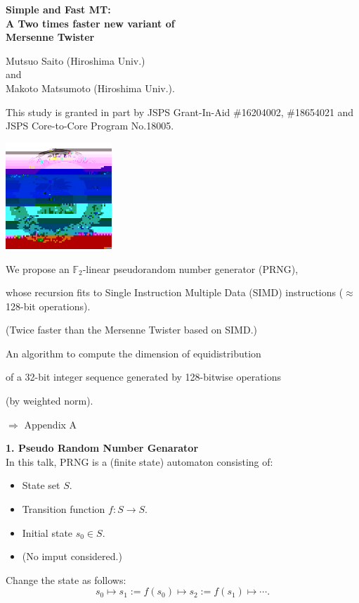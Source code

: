 \documentclass[a4j,12pt,landscape]{jarticle}
\title{}
\author{}
\date{\today}
\def\F2{{\mathbb F}_2}
\begin{document}
\Huge

\begin{center}
{\bf Simple and Fast MT:\\
  A Two times faster new variant of \\
  Mersenne Twister}
\vspace{1cm}

Mutsuo Saito (Hiroshima Univ.) \\
and \\
Makoto Matsumoto (Hiroshima Univ.).
\end{center}
\vspace{\fill}
\parbox{19cm}{\Large
This study is granted in part by
JSPS Grant-In-Aid \#16204002, \#18654021
and JSPS Core-to-Core Program No.18005.
}
\parbox{2cm}{\vskip 1cm \includegraphics*[width=4cm,height=4cm]{logo.jpg}}

\newpage
We propose
an $\F2$-linear pseudorandom number generator (PRNG),

whose recursion fits to Single Instruction Multiple Data (SIMD)
instructions ($\approx$ 128-bit operations).

(Twice faster than the Mersenne Twister
 based on SIMD.)

\vskip 5mm
An algorithm to compute the dimension 
of equidistribution 

of a 32-bit integer sequence
generated by 128-bitwise operations

(by weighted norm).

$\Rightarrow$ Appendix A

\newpage
\noindent
{\bf 1. Pseudo Random Number Genarator}\\

In this talk, PRNG is a (finite state) automaton consisting of:
\begin{itemize}
\item State set $S$. 
\item Transition function $f:S \to S$.
\item Initial state $s_0 \in S$.
\item (No imput considered.)
\end{itemize}
Change the state as follows:
$$
s_0 \mapsto s_1:= f(s_0) \mapsto s_2:=f(s_1) \mapsto \cdots.
$$
\end{document}
